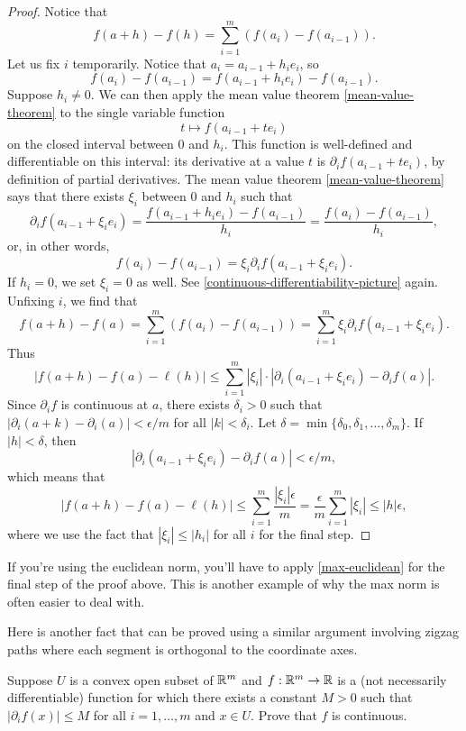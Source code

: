 \begin{proof}[Proof]
	Notice that 
	\[ f(a+h) - f(h) = \sum_{i = 1}^m \left( f(a_i) - f(a_{i-1}) \right). \]
	Let us fix $i$ temporarily. Notice that $a_i = a_{i-1} + h_i e_i$, so
	\[ f(a_i) - f(a_{i-1}) = f(a_{i-1}+h_ie_i) - f(a_{i-1}). \]
	Suppose $h_i \neq 0$. We can then apply the mean value theorem \ref{mean-value-theorem} to the single variable function \[ t \mapsto f(a_{i-1} + te_i) \] on the closed interval between $0$ and $h_i$. This function is well-defined and differentiable on this interval: its derivative at a value $t$ is $\partial_i f(a_{i-1} + te_i)$, by definition of partial derivatives. The mean value theorem \ref{mean-value-theorem} says that there exists $\xi_i$ between 0 and $h_i$ such that
	\[ \partial_i f(a_{i-1} + \xi_ie_i) = \frac{f(a_{i-1} + h_ie_i) - f(a_{i-1})}{h_i} = \frac{f(a_{i}) - f(a_{i-1})}{h_i}, \]
	or, in other words,
	\[ f(a_i) - f(a_{i-1}) = \xi_i \partial_i f(a_{i-1} + \xi_i e_i). \]
	If $h_i = 0$, we set $\xi_i = 0$ as well. 
	See \cref{continuous-differentiability-picture} again. Unfixing $i$, we find that
	\[ f(a+h) - f(a) = \sum_{i = 1}^m (f(a_i) - f(a_{i-1})) = \sum_{i = 1}^m \xi_i \partial_i f(a_{i-1} + \xi_i e_i). \]
	Thus
	\[ |f(a+h) - f(a)-\ell(h)| \leq \sum_{i = 1}^m |\xi_i| \cdot |\partial_i(a_{i-1}+\xi_ie_i) - \partial_if(a)|. \]
	Since $\partial_if$ is continuous at $a$, there exists $\delta_i > 0$ such that $|\partial_i(a+k) - \partial_i(a)| < \epsilon/m$ for all $|k| < \delta_i$. Let $\delta = \min\{\delta_0, \delta_1, \dotsc, \delta_m\}$. If $|h| < \delta$, then 
	\[ |\partial_i(a_{i-1} + \xi_ie_i) - \partial_i f(a)| < \epsilon/m, \]
	which means that
	\[ |f(a+h) - f(a)-\ell(h)| \leq \sum_{i = 1}^m \frac{|\xi_i| \epsilon}{m} = \frac{\epsilon}{m} \sum_{i = 1}^m |\xi_i| \leq |h| \epsilon , \]
	where we use the fact that $|\xi_i| \leq |h_i|$ for all $i$ for the final step. 
\end{proof}

\begin{unimportantremark}
	If you're using the euclidean norm, you'll have to apply \cref{max-euclidean} for the final step of the proof above. This is another example of why the max norm is often easier to deal with. 
\end{unimportantremark}

Here is another fact that can be proved using a similar argument involving zigzag paths where each segment is orthogonal to the coordinate axes. 

\begin{exercise}
	Suppose $U$ is a convex open subset of $\mathbb{R}^m$ and $f : \mathbb{R}^m \to \mathbb{R}$ is a (not necessarily differentiable) function for which there exists a constant $M > 0$ such that $|\partial_i f(x)| \leq M$ for all $i = 1, \dotsc, m$ and $x \in U$. Prove that $f$ is continuous. 
\end{exercise}

